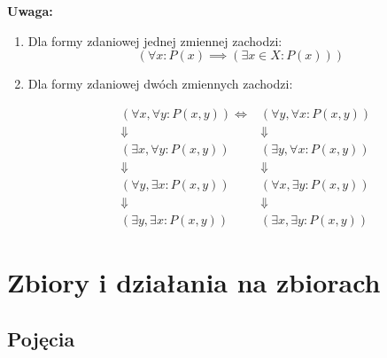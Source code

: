 \documentclass[a5paper,8pt]{article}
\theoremstyle{mythmstyle}
\begin{document}
            {\large{\textbf{Uwaga:}}}
            \begin{enumerate}
                \item Dla formy zdaniowej jednej zmiennej zachodzi:
                \begin{equation*}
                    (\forall x : P(x) \implies (\exists x \in X : P(x)))
                \end{equation*}

                \item Dla formy zdaniowej dwóch zmiennych zachodzi:

                \begin{equation*}
                    \begin{aligned}
                        &( \forall x, \forall y : P(x, y) ) \iff &( \forall y, \forall x : P(x,y)) \\
                        & \Downarrow & \Downarrow \\
                        &( \exists x, \forall y : P(x, y) ) & ( \exists y, \forall x : P(x,y)) \\
                        & \Downarrow & \Downarrow \\
                        &( \forall y, \exists x : P(x, y) ) & ( \forall x, \exists y : P(x,y)) \\
                        & \Downarrow & \Downarrow \\
                        &( \exists y, \exists x : P(x, y) ) & ( \exists x, \exists y : P(x,y))
                    \end{aligned}
                \end{equation*}

            \end{enumerate}



    \pagebreak
    \section{Zbiory i działania na zbiorach} %
    \label{sec:zbiory_i_dzialania_na_zbiorach}

    \subsection{Pojęcia} %
    \label{sub:pojęcia}
    
\end{document}
